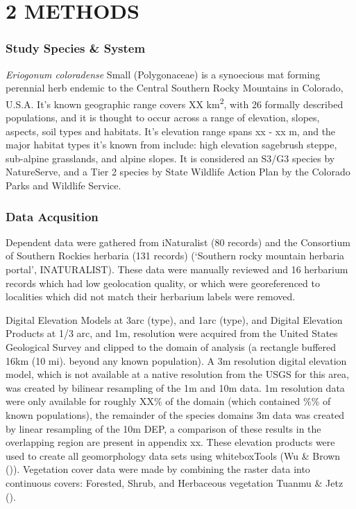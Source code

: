 \documentclass[
]{article}
\begin{document}
\section{2 \textbar{} METHODS}\label{methods}

\subsubsection{Study Species \& System}\label{study-species-system}

\emph{Eriogonum coloradense} Small (Polygonaceae) is a synoecious mat
forming perennial herb endemic to the Central Southern Rocky Mountains
in Colorado, U.S.A. It's known geographic range covers XX
km\textsuperscript{2}, with 26 formally described populations, and it is
thought to occur across a range of elevation, slopes, aspects, soil
types and habitats. It's elevation range spans xx - xx m, and the major
habitat types it's known from include: high elevation sagebrush steppe,
sub-alpine grasslands, and alpine slopes. It is considered an S3/G3
species by NatureServe, and a Tier 2 species by State Wildlife Action
Plan by the Colorado Parks and Wildlife Service.

\subsubsection{Data Acqusition}\label{data-acqusition}

Dependent data were gathered from iNaturalist (80 records) and the
Consortium of Southern Rockies herbaria (131 records) ({`Southern rocky
mountain herbaria portal'}, INATURALIST). These data were manually
reviewed and 16 herbarium records which had low geolocation quality, or
which were georeferenced to localities which did not match their
herbarium labels were removed.

Digital Elevation Models at 3arc (type), and 1arc (type), and Digital
Elevation Products at 1/3 arc, and 1m, resolution were acquired from the
United States Geological Survey and clipped to the domain of analysis (a
rectangle buffered 16km (10 mi). beyond any known population). A 3m
resolution digital elevation model, which is not available at a native
resolution from the USGS for this area, was created by bilinear
resampling of the 1m and 10m data. 1m resolution data were only
available for roughly XX\% of the domain (which contained \%\% of known
populations), the remainder of the species domains 3m data was created
by linear resampling of the 10m DEP, a comparison of these results in
the overlapping region are present in appendix xx. These elevation
products were used to create all geomorphology data sets using
whiteboxTools (Wu \& Brown ()).
Vegetation cover data were made by combining the raster data into
continuous covers: Forested, Shrub, and Herbaceous vegetation Tuanmu \&
Jetz ().
\end{document}
